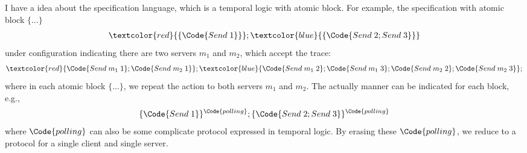 I have a idea about the specification language, which is a temporal logic with atomic block. For example, the specification with atomic block $\{...\}$
\begin{align*}
    \textcolor{red}{\{\Code{Send\;1}\}}; \textcolor{blue}{\{\Code{Send\;2;Send\;3}\}}
\end{align*}\noindent
under configuration indicating there are two servers $m_1$ and $m_2$, which accept the trace:
\begin{align*}
     \textcolor{red}{\Code{Send\;m_1\;1};\Code{Send\;m_2\;1}}; \textcolor{blue}{\Code{Send\;m_1\;2};\Code{Send\;m_1\;3};\Code{Send\;m_2\;2};\Code{Send\;m_2\;3}};
\end{align*}\noindent
where in each atomic block $\{...\}$, we repeat the action to both servers $m_1$ and $m_2$. The actually manner can be indicated for each block, e.g.,
\begin{align*}
    \{\Code{Send\;1}\}^{\Code{polling}}; \{\Code{Send\;2;Send\;3}\}^{\Code{polling}}
\end{align*}\noindent
where $\Code{polling}$ can also be some complicate protocol expressed in temporal logic. By erasing these $\Code{polling}$, we reduce to a protocol for a single client and single server.

